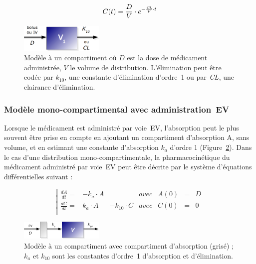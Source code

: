 \begin{equation}
C(t) = \frac{D}{V} \cdot e^{-\frac{\operatorname{\textit{CL}}}{V}\cdot t}
\label{eq:18}
\end{equation}

\begin{figure}[htbp]
	\centering
		\includegraphics[width=4cm]{figures/raster/FIG_2}
	\caption[Modèle à un compartiment]{Modèle à un compartiment où $D$ est la dose de médicament administrée, $V$ le volume de distribution. L'élimination peut être codée par $k_{10}$, une constante d'élimination d'ordre~1 ou par $\operatorname{\textit{CL}}$, une clairance d'élimination.}
	\label{fig:2}
\end{figure}

\subsubsection{Modèle mono-compartimental avec administration~\gls{EV}}
Lorsque le médicament est administré par voie~\gls{EV}, l'absorption peut le plus souvent être prise en compte en ajoutant un compartiment d'absorption A, sans volume, et en estimant une constante d'absorption $k_{a}$ d'ordre 1 (Figure~\ref{fig:3}). Dans le cas d'une distribution mono-compartimentale, la pharmacocinétique du médicament administré par voie~\gls{EV} peut être décrite par le système d'équations différentielles suivant :


\begin{equation}
\left| \begin{matrix}
\frac{dA}{dt} = & -k_{a}\cdot A &                & avec & A(0)&=&D\\ 
\frac{dC}{dt} = &  k_{a}\cdot A & -k_{10}\cdot C & avec & C(0)&=&0\\ 
\end{matrix}\right.
\label{eq:19}
\end{equation}

\begin{figure}[htbp]
	\centering
		\includegraphics[width=4cm]{figures/raster/FIG_3}
	\caption[Modèle à un compartiment avec compartiment d'absorption]{Modèle à un compartiment avec compartiment d'absorption (grisé) ; $k_{a}$ et $k_{10}$ sont les constantes d'ordre~1 d'absorption et d'élimination.}
	\label{fig:3}
\end{figure}

